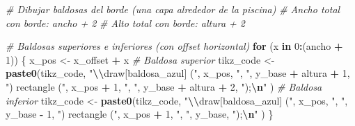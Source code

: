 \documentclass[
]{article}
\newenvironment{Shaded}{\begin{snugshade}}{\end{snugshade}}
\newcommand{\CommentTok}[1]{\textcolor[rgb]{0.56,0.35,0.01}{\textit{#1}}}
\newcommand{\ControlFlowTok}[1]{\textcolor[rgb]{0.13,0.29,0.53}{\textbf{#1}}}
\newcommand{\DecValTok}[1]{\textcolor[rgb]{0.00,0.00,0.81}{#1}}
\newcommand{\FunctionTok}[1]{\textcolor[rgb]{0.13,0.29,0.53}{\textbf{#1}}}
\newcommand{\NormalTok}[1]{#1}
\newcommand{\OtherTok}[1]{\textcolor[rgb]{0.56,0.35,0.01}{#1}}
\newcommand{\SpecialCharTok}[1]{\textcolor[rgb]{0.81,0.36,0.00}{\textbf{#1}}}
\newcommand{\StringTok}[1]{\textcolor[rgb]{0.31,0.60,0.02}{#1}}
\begin{document}
\begin{Shaded}
\begin{Highlighting}[]
    \CommentTok{\# Dibujar baldosas del borde (una capa alrededor de la piscina)}
    \CommentTok{\# Ancho total con borde: ancho + 2}
    \CommentTok{\# Alto total con borde: altura + 2}
    
    \CommentTok{\# Baldosas superiores e inferiores (con offset horizontal)}
    \ControlFlowTok{for}\NormalTok{ (x }\ControlFlowTok{in} \DecValTok{0}\SpecialCharTok{:}\NormalTok{(ancho }\SpecialCharTok{+} \DecValTok{1}\NormalTok{)) \{}
\NormalTok{      x\_pos }\OtherTok{\textless{}{-}}\NormalTok{ x\_offset }\SpecialCharTok{+}\NormalTok{ x}
      \CommentTok{\# Baldosa superior}
\NormalTok{      tikz\_code }\OtherTok{\textless{}{-}} \FunctionTok{paste0}\NormalTok{(tikz\_code,}
        \StringTok{"}\SpecialCharTok{\textbackslash{}\textbackslash{}}\StringTok{draw[baldosa\_azul] ("}\NormalTok{, x\_pos, }\StringTok{", "}\NormalTok{, y\_base }\SpecialCharTok{+}\NormalTok{ altura }\SpecialCharTok{+} \DecValTok{1}\NormalTok{, }\StringTok{") rectangle ("}\NormalTok{, x\_pos }\SpecialCharTok{+} \DecValTok{1}\NormalTok{, }\StringTok{", "}\NormalTok{, y\_base }\SpecialCharTok{+}\NormalTok{ altura }\SpecialCharTok{+} \DecValTok{2}\NormalTok{, }\StringTok{");}\SpecialCharTok{\textbackslash{}n}\StringTok{"}
\NormalTok{      )}
      \CommentTok{\# Baldosa inferior}
\NormalTok{      tikz\_code }\OtherTok{\textless{}{-}} \FunctionTok{paste0}\NormalTok{(tikz\_code,}
        \StringTok{"}\SpecialCharTok{\textbackslash{}\textbackslash{}}\StringTok{draw[baldosa\_azul] ("}\NormalTok{, x\_pos, }\StringTok{", "}\NormalTok{, y\_base }\SpecialCharTok{{-}} \DecValTok{1}\NormalTok{, }\StringTok{") rectangle ("}\NormalTok{, x\_pos }\SpecialCharTok{+} \DecValTok{1}\NormalTok{, }\StringTok{", "}\NormalTok{, y\_base, }\StringTok{");}\SpecialCharTok{\textbackslash{}n}\StringTok{"}
\NormalTok{      )}
\NormalTok{    \}}
    

\end{Highlighting}
\end{Shaded}
\end{document}
